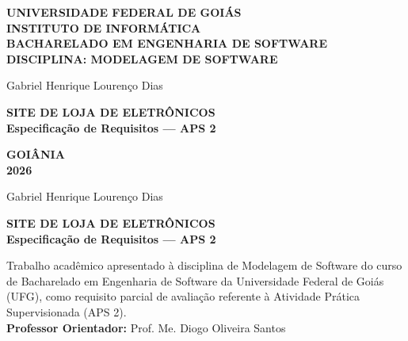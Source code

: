 \documentclass[12pt,a4paper]{article}
\begin{document}

\begin{titlepage}
  \thispagestyle{empty}
  \begin{center}
    \textbf{\large UNIVERSIDADE FEDERAL DE GOIÁS}\\[0.2cm]
    \textbf{\large INSTITUTO DE INFORMÁTICA}\\[0.2cm]
    \textbf{\large BACHARELADO EM ENGENHARIA DE SOFTWARE}\\[0.2cm]
    \textbf{\large DISCIPLINA: MODELAGEM DE SOFTWARE}

    \vspace{3.2cm}
    {\large
    Gabriel Henrique Lourenço Dias\par}

    \vspace{3.5cm}
    \textbf{\Large SITE DE LOJA DE ELETRÔNICOS}\\[0.4cm]
    \textbf{\large Especificação de Requisitos --- APS 2}\par

    \vfill
    \textbf{GOIÂNIA}\\[0.2cm]
    \textbf{2026}
  \end{center}
\end{titlepage}

\thispagestyle{empty}
\begin{center}
  {\large
  Gabriel Henrique Lourenço Dias\par}

  \vspace{4.0cm}
  \textbf{\Large SITE DE LOJA DE ELETRÔNICOS}\\[0.4cm]
  \textbf{\large Especificação de Requisitos --- APS 2}\par
\end{center}

\vspace{2.5cm}
\begin{flushright}
  \begin{minipage}{0.52\textwidth}
    \begin{singlespace}
      {\small Trabalho acadêmico apresentado à disciplina de Modelagem
      de Software do curso de Bacharelado em Engenharia de Software da
      Universidade Federal de Goiás (UFG), como requisito parcial de
      avaliação referente à Atividade Prática Supervisionada (APS
      2).\\[0.4cm]
      \textbf{Professor Orientador:} Prof. Me. Diogo Oliveira Santos}
    \end{singlespace}
  \end{minipage}
\end{flushright}
\end{document}
